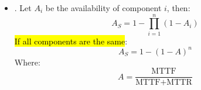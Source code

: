 \begin{itemize}
    \item {}. Let $A_i$ be the availability of component $i$, then:
    \begin{equation}
        A_{S} = 1 - \displaystyle\prod_{i=1}^n \left(1 - A_{i}\right)
    \end{equation}
    \hl{If all components are the same}:
    \begin{equation}\label{eq: Availability of Parallel System - Simplified}
        A_{S} = 1 - \left(1 - A\right)^{n}
    \end{equation}
    Where:
    \begin{equation}\label{eq: Availability}
        A = \frac{\text{MTTF}}{\text{MTTF} + \text{MTTR}}
    \end{equation}
\end{itemize}

